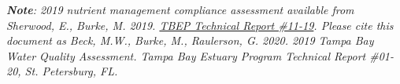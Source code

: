 \documentclass[final,t]{beamer}\usepackage[]{graphicx}\usepackage[]{color}
\begin{document}
\begin{frame}
\begin{columns}[t]
\begin{column}{.79\linewidth}
\vspace{-0.1in}

\tiny \textit{\textbf{Note}: 2019 nutrient management compliance assessment available from Sherwood, E., Burke, M. 2019. \href{http://www.tbeptech.org/TBEP_TECH_PUBS/2019/TBEP_11-19_TBNMC_2018_RA_Annual_Assessment.pdf}{TBEP Technical Report \#11-19}.  Please cite this document as Beck, M.W., Burke, M., Raulerson, G. 2020. 2019 Tampa Bay Water Quality Assessment. Tampa Bay Estuary Program Technical Report \#01-20, St. Petersburg, FL.} \\

\end{column}

\end{columns}

\end{frame}
\end{document}
